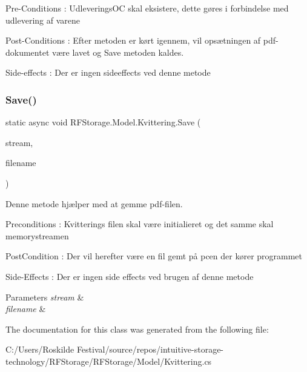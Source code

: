 Pre-\/\+Conditions \+: Udleverings\+OC skal eksistere, dette gøres i forbindelse med udlevering af varene 

Post-\/\+Conditions \+: Efter metoden er kørt igennem, vil opsætningen af pdf-\/dokumentet være lavet og Save metoden kaldes. 

Side-\/effects \+: Der er ingen sideeffects ved denne metode\mbox{\label{class_r_f_storage_1_1_model_1_1_kvittering_abf9118e928ad6a4cc9e771b0875353ab}} 
\subsubsection{\texorpdfstring{Save()}{Save()}}
{\footnotesize\ttfamily static async void R\+F\+Storage.\+Model.\+Kvittering.\+Save (\begin{DoxyParamCaption}\item[{Stream}]{stream,  }\item[{string}]{filename }\end{DoxyParamCaption})\hspace{0.3cm}{\ttfamily [static]}}



Denne metode hjælper med at gemme pdf-\/filen. 

Preconditions \+: Kvitterings filen skal være initialieret og det samme skal memorystreamen

Post\+Condition \+: Der vil herefter være en fil gemt på pcen der kører programmet

Side-\/\+Effects \+: Der er ingen side effects ved brugen af denne metode


\begin{DoxyParams}{Parameters}
{\em stream} & \\
\hline
{\em filename} & \\
\hline
\end{DoxyParams}


The documentation for this class was generated from the following file\+:\begin{DoxyCompactItemize}
\item 
C\+:/\+Users/\+Roskilde Festival/source/repos/intuitive-\/storage-\/technology/\+R\+F\+Storage/\+R\+F\+Storage/\+Model/Kvittering.\+cs\end{DoxyCompactItemize}
